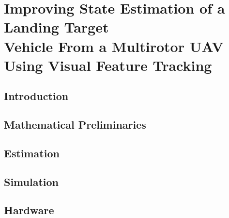 
\chapter[Improving State Estimation of a Landing Target Vehicle
From a Multirotor UAV Using Visual Feature Tracking]{Improving State Estimation of a
  Landing Target \\ Vehicle From a Multirotor UAV Using Visual Feature
Tracking\protect\footnotemark}
\label{chp:estimation_paper}

\graphicspath{{estimation_paper/}}

\section{Introduction} \label{sec:intro}



\section{Mathematical Preliminaries} \label{sec:math_prelim}




\section{Estimation} \label{sec:estimation}





\section{Simulation} \label{sec:est_paper_simulation}


\section{Hardware} \label{sec:est_paper_hardware}







